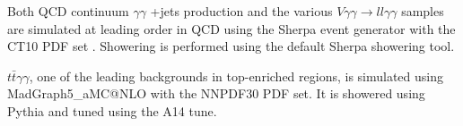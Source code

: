 Both QCD continuum $\gamma\gamma$ +jets production and the various $V\gamma\gamma \rightarrow ll\gamma\gamma$ samples are simulated at leading order in QCD using the Sherpa event generator with the CT10 PDF set \cite{CT10}. Showering is performed using the default Sherpa showering tool. 

\begin{sloppypar}
$t\bar{t}\gamma\gamma$, one of the leading backgrounds in top-enriched regions, is simulated using {MadGraph5\_aMC@NLO} with the NNPDF30 PDF set. It is showered using Pythia and tuned using the A14 tune.
\end{sloppypar}


\begin{table}[h!]
  \centering
\caption{Summary of nominal background samples}
\label{tab:bckg_samples}
\end{table}  

